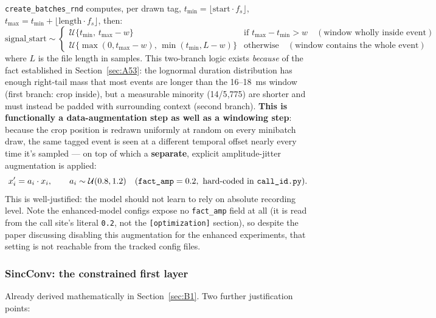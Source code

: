 \documentclass[11pt]{article}
\begin{document}
\texttt{create\_batches\_rnd} computes, per drawn tag,
$t_{\min}=\lfloor \text{start}\cdot f_s\rfloor$,
$t_{\max}=t_{\min}+\lfloor \text{length}\cdot f_s\rfloor$, then:
\[
\text{signal\_start} \sim
\begin{cases}
\mathcal{U}\{t_{\min},\, t_{\max}-w\} & \text{if } t_{\max}-t_{\min} > w
\quad(\text{window wholly inside event}) \\[4pt]
\mathcal{U}\{\max(0, t_{\max}-w),\, \min(t_{\min}, L-w)\} & \text{otherwise}
\quad(\text{window contains the whole event})
\end{cases}
\]
where $L$ is the file length in samples. This two-branch logic exists
\emph{because} of the fact established in Section~\ref{sec:A53}: the
lognormal duration distribution has enough right-tail mass that most events
are longer than the 16--18~ms window (first branch: crop inside), but a
measurable minority (14/5{,}775) are shorter and must instead be padded with
surrounding context (second branch). \textbf{This is functionally a
data-augmentation step as well as a windowing step}: because the crop
position is redrawn uniformly at random on every minibatch draw, the same
tagged event is seen at a different temporal offset nearly every time it's
sampled --- on top of which a \textbf{separate}, explicit amplitude-jitter
augmentation is applied:
\[
x'_i = a_i \cdot x_i, \qquad a_i \sim \mathcal{U}(0.8, 1.2) \quad
(\text{\texttt{fact\_amp}}=0.2,\ \text{hard-coded in \texttt{call\_id.py}}).
\]
This is well-justified: the model should not learn to rely on absolute
recording level. Note the enhanced-model configs expose no \texttt{fact\_amp}
field at all (it is read from the call site's literal \texttt{0.2}, not the
\texttt{[optimization]} section), so despite the paper discussing disabling
this augmentation for the enhanced experiments, that setting is not
reachable from the tracked config files.

\subsubsection{SincConv: the constrained first layer}
\label{sec:B33}

Already derived mathematically in Section~\ref{sec:B1}. Two further
justification points:
\end{document}
